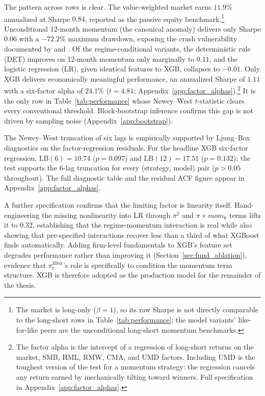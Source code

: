 The pattern across rows is clear. The value-weighted market earns $11.9\%$ annualized at Sharpe $0.84$, reported as the passive equity benchmark.\footnote{The market is long-only ($\beta = 1$), so its raw Sharpe is not directly comparable to the long-short rows in Table~\ref{tab:performance}; the model variants' like-for-like peers are the unconditional long-short momentum benchmarks.} Unconditional 12-month momentum (the canonical anomaly) delivers only Sharpe $0.06$ with a $-72.2\%$ maximum drawdown, exposing the crash vulnerability documented by \citet{DanielMoskowitz2016} and \citet{BarrosoSantaClara2015}. Of the regime-conditional variants, the deterministic rule (DET) improves on 12-month momentum only marginally to $0.11$, and the logistic regression (LR), given identical features to XGB, collapses to $-0.01$. Only XGB delivers economically meaningful performance, an annualized Sharpe of $1.11$ with a six-factor alpha of $24.1\%$ ($t = 4.81$; Appendix~\ref{app:factor_alphas}).\footnote{The factor alpha is the intercept of a regression of long-short returns on the market, SMB, HML, RMW, CMA, and UMD factors. Including UMD is the toughest version of the test for a momentum strategy: the regression cancels any return earned by mechanically tilting toward winners. Full specification in Appendix~\ref{app:factor_alphas}.} It is the only row in Table~\ref{tab:performance} whose Newey--West $t$-statistic clears every conventional threshold. Block-bootstrap inference confirms this gap is not driven by sampling noise (Appendix~\ref{app:bootstrap}).

The Newey--West truncation of six lags is empirically supported by Ljung--Box diagnostics on the factor-regression residuals. For the headline XGB six-factor regression, $\text{LB}(6) = 10.74$ ($p = 0.097$) and $\text{LB}(12) = 17.51$ ($p = 0.132$); the test supports the 6-lag truncation for every (strategy, model) pair ($p > 0.05$ throughout). The full diagnostic table and the residual ACF figure appear in Appendix~\ref{app:factor_alphas}.

A further specification confirms that the limiting factor is linearity itself. Hand-engineering the missing nonlinearity into LR through $\pi^2$ and $\pi \times mom_k$ terms lifts it to $0.32$, establishing that the regime-momentum interaction is real while also showing that pre-specified interactions recover less than a third of what XGBoost finds automatically. Adding firm-level fundamentals to XGB's feature set degrades performance rather than improving it (Section~\ref{sec:fund_ablation}), evidence that $\pi_t^{\text{filter}}$'s role is specifically to condition the momentum term structure. XGB is therefore adopted as the production model for the remainder of the thesis.

